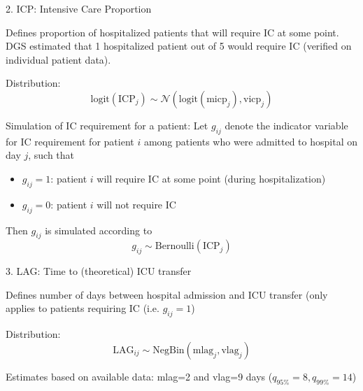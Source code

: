 \documentclass[t,9pt,xcolor=dvipsnames]{beamer}              %
\begin{document}
\begin{frame}{2. ICP: Intensive Care Proportion}

Defines proportion of hospitalized patients that will require IC at some point. DGS estimated that 1 hospitalized patient out of 5 would require IC (verified on individual patient data).
\medskip

Distribution:
\begin{equation*}
\text{logit}(\text{ICP}_{j}) \sim \mathcal{N}\left(\text{logit}(\text{micp}_{j}), \text{vicp}_{j}\right)
\end{equation*}
\medskip

Simulation of IC requirement for a patient:
Let $g_{ij}$ denote the indicator variable for IC requirement for patient $i$ among patients who were admitted to hospital on day $j$, such that
\begin{itemize}
\item $g_{ij}=1$: patient $i$ will require IC at some point (during hospitalization)
\item $g_{ij}=0$: patient $i$ will not require IC
\end{itemize}

Then $g_{ij}$ is simulated according to
\begin{equation*}
g_{ij} \sim \text{Bernoulli}\left(\text{ICP}_{j}\right)
\end{equation*} 

\note{
\tiny
\justifying

}
\end{frame}

\begin{frame}{3. LAG: Time to (theoretical) ICU transfer}

Defines number of days between hospital admission and ICU transfer (only applies to patients requiring IC (i.e. $g_{ij}=1$)
\medskip

Distribution:
\begin{equation*}
\text{LAG}_{ij} \sim \text{NegBin}\left(\text{mlag}_{j}, \text{vlag}_{j}\right)
\end{equation*}
\medskip

Estimates based on available data: mlag=2 and vlag=9 days ($q_{95\%}=8, q_{99\%}=14$)

\note{
\tiny
\justifying

}
\end{frame}
\end{document}
